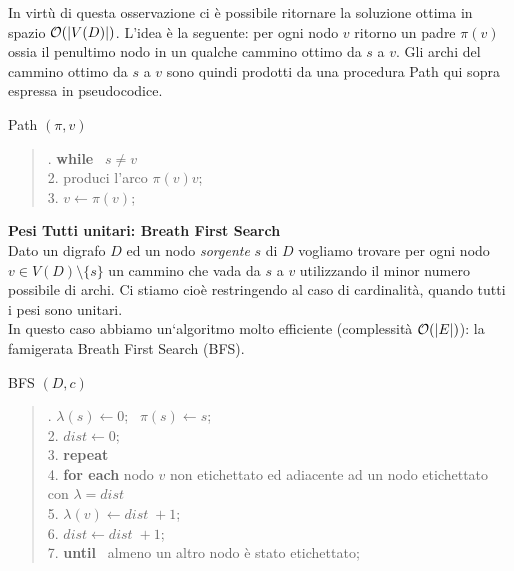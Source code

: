 \documentclass[10pt]{article}
\def\sm{\setminus}
\def\Ord{{\cal O}}
\begin{document}
\begin{center}
\end{center}

In virt\`u di questa osservazione ci \`e possibile
ritornare la soluzione ottima in spazio $\Ord(|V(D)|)$.
L'idea \`e la seguente:
per ogni nodo $v$ ritorno un padre $\pi(v)$
ossia il penultimo nodo in un qualche cammino
ottimo da $s$ a $v$.
Gli archi del cammino ottimo da $s$ a $v$ sono
quindi prodotti da una procedura {\sc Path}
qui sopra espressa in pseudocodice.\\

\begin{algorithm}
\caption{{\sc Path} $(\pi,v)$}
\begin{quote}
.\hspace{2mm} {\bf while} \ $s\neq v$\\
2.\hspace{12mm} produci l'arco $\pi(v)v$;\\
3.\hspace{12mm} $v \leftarrow \pi(v)$;\\
\end{quote}
\end{algorithm}


   {\Large \bf Pesi Tutti unitari: Breath First Search}\\

Dato un digrafo $D$ ed un nodo {\em sorgente} $s$ di $D$
vogliamo trovare per ogni nodo $v\in V(D)\sm \{s\}$
un cammino che vada da $s$ a $v$ utilizzando il minor
numero possibile di archi.
Ci stiamo cio\`e restringendo
al caso di cardinalit\`a,
quando tutti i pesi sono unitari.\\

In questo caso abbiamo un`algoritmo
molto efficiente (complessit\`a $\Ord(|E|)$):
la famigerata Breath First Search (BFS).


\begin{algorithm}   
\caption{{\sc BFS} $(D,c)$}
\begin{quote}
.\hspace{2mm} $\lambda(s) \leftarrow 0$; \ $\pi(s) \leftarrow s$;\\
2.\hspace{2mm} $dist \leftarrow 0$;\\
3.\hspace{2mm} {\bf repeat}\\
4.\hspace{8mm} {\bf for each} nodo $v$ non etichettato ed adiacente
                ad un nodo etichettato con $\lambda = dist$\\
5.\hspace{14mm} $\lambda(v) \leftarrow dist\;+1$;\\
6.\hspace{8mm} $dist \leftarrow dist\;+1$;\\  
7.\hspace{2mm} {\bf until} \ almeno un altro nodo \`e stato etichettato; 

\end{quote}
\end{algorithm}
\end{document}

